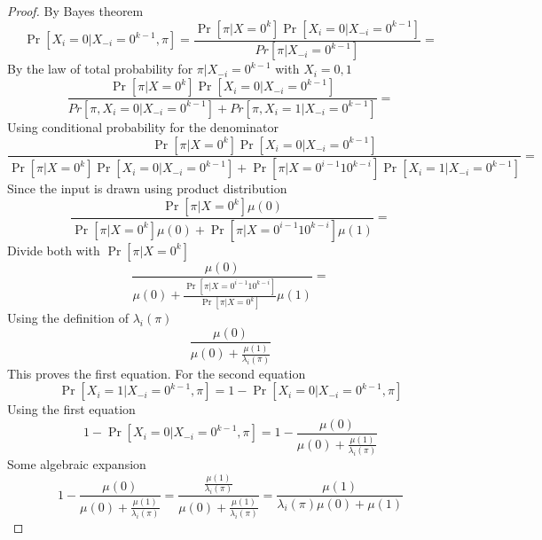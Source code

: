 \begin{proof}
    By Bayes  theorem
    \begin{equation*}
        \Pr[X_i = 0 | X_{-i}=0^{k-1}, \pi] = \frac{\Pr[\pi | X=0^k]\Pr[X_i=0|X_{-i}=0^{k-1}]}{Pr[\pi|X_{-i} = 0^{k-1}]} = 
    \end{equation*}
    By the law of total probability for $\pi|X_{-i} = 0^{k-1}$ with $X_i=0,1$
    \begin{equation*}
        \frac{\Pr[\pi | X=0^k]\Pr[X_i=0|X_{-i}=0^{k-1}]}{Pr[\pi,X_i=0|X_{-i} = 0^{k-1}] + Pr[\pi,X_i=1|X_{-i} = 0^{k-1}]} = 
    \end{equation*}
    Using conditional probability for the denominator
    \begin{equation*}
        \frac{\Pr[\pi | X=0^k]\Pr[X_i=0|X_{-i}=0^{k-1}]}{\Pr[\pi | X=0^k]\Pr[X_i=0|X_{-i}=0^{k-1}] + \Pr[\pi | X=0^{i-1}10^{k-i}]\Pr[X_i=1|X_{-i}=0^{k-1}]} =
    \end{equation*}
    Since the input is drawn using product distribution
    \begin{equation*}
        \frac{\Pr[\pi | X=0^k]\mu(0)}{\Pr[\pi | X=0^k]\mu(0) + \Pr[\pi | X=0^{i-1}10^{k-i}]\mu(1)} = 
    \end{equation*}
    Divide both with $\Pr[\pi | X=0^k]$
    \begin{equation*}
        \frac{\mu(0)}{\mu(0) + \frac{\Pr[\pi | X=0^{i-1}10^{k-i}]}{\Pr[\pi | X=0^k]}\mu(1)} = 
    \end{equation*}
    Using the definition of $\lambda_i(\pi)$
    \begin{equation*}
        \frac{\mu(0)}{\mu(0) + \frac{\mu(1)}{\lambda_i(\pi)}}
    \end{equation*}
    This proves the first equation.
    For the second equation
    \begin{equation*}
        \Pr[X_i = 1 | X_{-i}=0^{k-1}, \pi] = 1 - \Pr[X_i = 0 | X_{-i}=0^{k-1}, \pi]
    \end{equation*}
    Using the first equation
    \begin{equation*}
        1 - \Pr[X_i = 0 | X_{-i}=0^{k-1}, \pi] = 1 - \frac{\mu(0)}{\mu(0) + \frac{\mu(1)}{\lambda_i(\pi)}}
    \end{equation*}
    Some algebraic expansion
    \begin{equation*}
        1 - \frac{\mu(0)}{\mu(0) + \frac{\mu(1)}{\lambda_i(\pi)}} = \frac{\frac{\mu(1)}{\lambda_i(\pi)}}{\mu(0) + \frac{\mu(1)}{\lambda_i(\pi)}} = \frac{\mu(1)}{\lambda_i(\pi)\mu(0) + \mu(1)}
    \end{equation*}
\end{proof}
